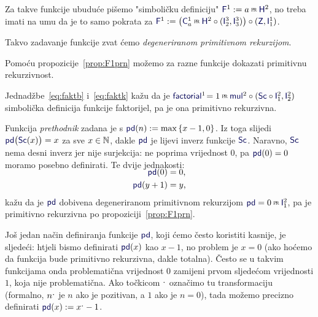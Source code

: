 \begin{definicija}[{name=[degenerirana primitivna rekurzija]}]\label{def:F1prn}
Za takve funkcije ubuduće pišemo "simboličku definiciju" $\f F^1:=a\pr\f H^2$, no treba imati na umu da je to samo pokrata za $\f F^1:=\bigl(\f C_a^1\pr\f H^2\circ(\f I_2^3,\f I_3^3)\bigr)\circ(\f Z,\f I_1^1)$.

Takvo zadavanje funkcije zvat ćemo \emph{degeneriranom primitivnom rekurzijom}.
\end{definicija}

Pomoću propozicije~\ref{prop:F1prn} možemo za razne funkcije dokazati primitivnu rekurzivnost.%

\begin{primjer}[{name=[primitivna rekurzivnost funkcije faktorijel]}]\label{pr:factorialprn}
Jednadžbe~\eqref{eq:faktb} i~\eqref{eq:faktk} kažu da je $\f{factorial}^1\!=1\pr\f{mul}^2\circ(\f{Sc}\circ\f I_1^2,\f I_2^2)$ simbolička definicija funkcije faktorijel, pa je ona primitivno rekurzivna.
\end{primjer}

\begin{primjer}[{name=[primitivna rekurzivnost funkcije prethodnik]}]
Funkcija \emph{prethodnik} zadana je s $\f{pd}(n):=\max\,\{x-1,0\}$. Iz toga slijedi $\f{pd}\bigl(\f{Sc}(x)\bigr)=x$ za sve $x\in{\mathbb N}$, dakle $\f{pd}$ je lijevi inverz funkcije $\f{Sc}$. Naravno, $\f{Sc}$ nema desni inverz jer nije surjekcija: ne poprima vrijednost $0$, pa $\f{pd}(0)=0$ moramo posebno definirati. Te dvije jednakosti:
\begin{align}
\SwapAboveDisplaySkip
    \f{pd}(0)&=0\text,\\
    \f{pd}(y+1)&=y\text,
\end{align}
kažu da je $\f{pd}$ dobivena degeneriranom primitivnom rekurzijom $\f{pd}=0\pr\f I_1^2$, pa je primitivno rekurzivna po propoziciji~\ref{prop:F1prn}.
\end{primjer}

\begin{napomena}[{name=[zamjena nule jedinicom u nekim brojevnim funkcijama]}]\label{nap:crtica}
Još jedan način definiranja funkcije $\f{pd}$, koji ćemo često koristiti kasnije, je sljedeći: htjeli bismo definirati $\f{pd}(x)$ kao $x-1$, no problem je $x=0$ (ako hoćemo da funkcija bude primitivno rekurzivna, dakle totalna). Često se u takvim funkcijama onda problematična vrijednost $0$ zamijeni prvom sljedećom vrijednosti $1$, koja nije problematična. Ako točkicom $\sp{\text{\normalsize.}}$ označimo tu transformaciju (formalno, $n\sp{\text{\normalsize.}}$ je $n$ ako je pozitivan, a $1$ ako je $n=0$), tada možemo precizno definirati $\f{pd}(x):=x\bump-1$.
\end{napomena}

